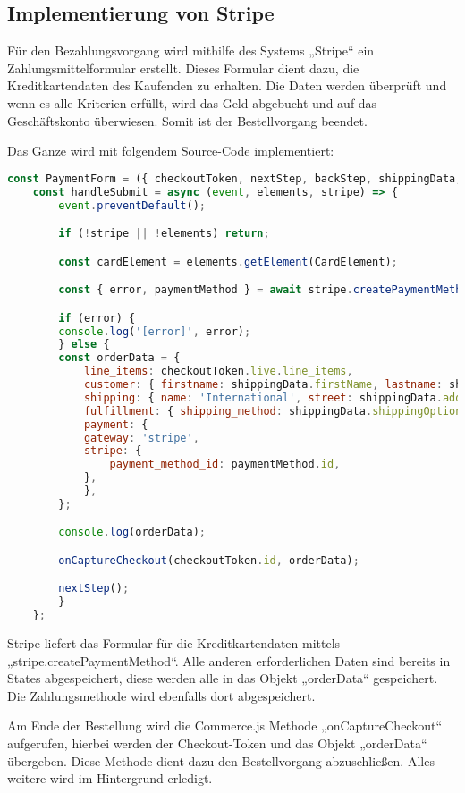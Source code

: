 \newpage

\subsection{Implementierung von Stripe}

Für den Bezahlungsvorgang wird mithilfe des Systems „Stripe“ ein Zahlungsmittelformular erstellt. Dieses Formular dient dazu, die Kreditkartendaten des Kaufenden zu erhalten. Die Daten werden überprüft und wenn es alle Kriterien erfüllt, wird das Geld abgebucht und auf das Geschäftskonto überwiesen. Somit ist der Bestellvorgang beendet.

Das Ganze wird mit folgendem Source-Code implementiert:

\begin{lstlisting}[language=JavaScript]
    const PaymentForm = ({ checkoutToken, nextStep, backStep, shippingData, onCaptureCheckout }) => {
    const handleSubmit = async (event, elements, stripe) => {
        event.preventDefault();

        if (!stripe || !elements) return;

        const cardElement = elements.getElement(CardElement);

        const { error, paymentMethod } = await stripe.createPaymentMethod({ type: 'card', card: cardElement });

        if (error) {
        console.log('[error]', error);
        } else {
        const orderData = {
            line_items: checkoutToken.live.line_items,
            customer: { firstname: shippingData.firstName, lastname: shippingData.lastName, email: shippingData.email },
            shipping: { name: 'International', street: shippingData.address1, town_city: shippingData.city, county_state: shippingData.shippingSubdivision, postal_zip_code: shippingData.zip, country: shippingData.shippingCountry },
            fulfillment: { shipping_method: shippingData.shippingOption },
            payment: {
            gateway: 'stripe',
            stripe: {
                payment_method_id: paymentMethod.id,
            },
            },
        };

        console.log(orderData);

        onCaptureCheckout(checkoutToken.id, orderData);

        nextStep();
        }
    };
\end{lstlisting}

Stripe liefert das Formular für die Kreditkartendaten mittels „stripe.createPaymentMethod“. Alle anderen erforderlichen Daten sind bereits in States abgespeichert, diese werden alle in das Objekt „orderData“ gespeichert. Die Zahlungsmethode wird ebenfalls dort abgespeichert. 

Am Ende der Bestellung  wird die Commerce.js Methode „onCaptureCheckout“ aufgerufen, hierbei werden der Checkout-Token und das Objekt „orderData“ übergeben. Diese Methode dient dazu den Bestellvorgang abzuschließen. Alles weitere wird im Hintergrund erledigt.